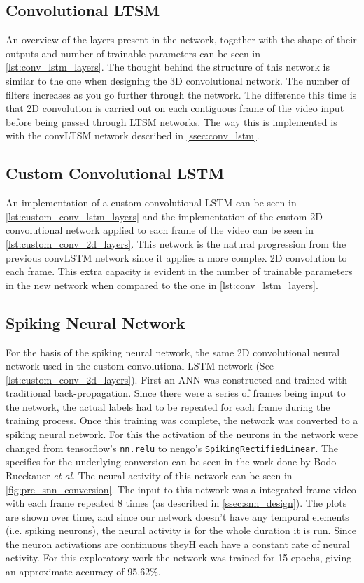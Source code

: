 \subsection{Convolutional LTSM}

An overview of the layers present in the network, together with the shape of their outputs and number of trainable parameters can be seen in \cref{lst:conv_lstm_layers}. The thought behind the structure of this network is similar to the one when designing the 3D convolutional network. The number of filters increases as you go further through the network. The difference this time is that 2D convolution is carried out on each contiguous frame of the video input before being passed through LTSM networks. The way this is implemented is with the convLTSM network described in \cref{ssec:conv_lstm}.

\subsection{Custom Convolutional LSTM}

An implementation of a custom convolutional LSTM can be seen in \cref{lst:custom_conv_lstm_layers} and the implementation of the custom 2D convolutional network applied to each frame of the video can be seen in \cref{lst:custom_conv_2d_layers}. This network is the natural progression from the previous convLSTM network since it applies a more complex 2D convolution to each frame. This extra capacity is evident in the number of trainable parameters in the new network when compared to the one in \cref{lst:conv_lstm_layers}.

\subsection{Spiking Neural Network}

For the basis of the spiking neural network, the same 2D convolutional neural network used in the custom convolutional LSTM network (See \cref{lst:custom_conv_2d_layers}). First an ANN was constructed and trained with traditional back-propagation. Since there were a series of frames being input to the network, the actual labels had to be repeated for each frame during the training process. Once this training was complete, the network was converted to a spiking neural network. For this the activation of the neurons in the network were changed from tensorflow's \lstinline{nn.relu} to nengo's \lstinline{SpikingRectifiedLinear}. The specifics for the underlying conversion can be seen in the work done by Bodo Rueckauer \textit{et al}\cite{Ann2Snn}. The neural activity of this network can be seen in \cref{fig:pre_snn_conversion}. The input to this network was a integrated frame video with each frame repeated 8 times (as described in \cref{ssec:snn_design}). The plots are shown over time, and since our network doesn't have any temporal elements (i.e. spiking neurons), the neural activity is for the whole duration it is run. Since the neuron activations are continuous theyH each have a constant rate of neural activity. For this exploratory work the network was trained for 15 epochs, giving an approximate accuracy of 95.62\%.


